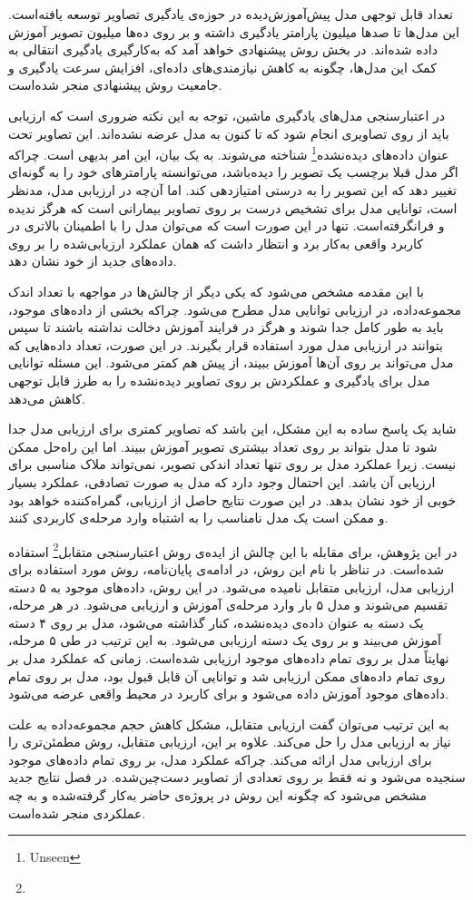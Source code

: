 تعداد قابل توجهی مدل پیش‌آموزش‌دیده در حوزه‌ی یادگیری تصاویر توسعه یافته‌است.
این مدل‌ها  تا صد‌ها میلیون پارامتر یادگیری داشته و بر روی ده‌ها میلیون تصویر آموزش داده شده‌اند. 
در بخش روش پیشنهادی خواهد آمد که به‌کارگیری یادگیری انتقالی به کمک این مدل‌ها، چگونه به کاهش نیازمندی‌های داده‌ای، افزایش سرعت یادگیری و جامعیت روش پیشنهادی منجر شده‌است.


در اعتبار‌سنجی مدل‌های یادگیری ماشین، توجه به این نکته ضروری است که ارزیابی باید از روی تصاویری انجام شود که تا کنون به مدل عرضه نشده‌اند.
این تصاویر تحت عنوان داده‌های
 دیده‌نشده\footnote{Unseen}
 شناخته می‌شوند.
به یک بیان، این امر بدیهی است.
چراکه اگر مدل قبلا برچسب یک تصویر را دیده‌باشد، می‌توانسته پارامتر‌های خود را به گونه‌ای تغییر دهد که این تصویر را به درستی امتیازدهی کند.
اما آن‌چه در ارزیابی مدل، مدنظر است، توانایی مدل برای تشخیص درست بر روی تصاویر بیمارانی است که هرگز ندیده و فرانگرفته‌است.
تنها در این صورت است که می‌توان مدل را با اطمینان بالاتری در کاربرد واقعی به‌کار برد و انتظار داشت که همان عملکرد ارزیابی‌شده را بر روی داده‌های جدید از خود نشان دهد.

با این مقدمه مشخص می‌شود که
یکی دیگر از چالش‌ها در مواجهه با تعداد اندک مجموعه‌داده، در ارزیابی توانایی مدل مطرح می‌شود.
چراکه بخشی از داده‌های موجود، باید به طور کامل جدا شوند و هرگز در فرایند آموزش دخالت نداشته باشند تا سپس بتوانند در ارزیابی مدل مورد استفاده قرار بگیرند.
در این صورت، تعداد داده‌هایی که مدل می‌تواند بر روی آن‌ها آموزش ببیند، از پیش هم کمتر می‌شود.
این مسئله توانایی مدل برای یادگیری و عملکردش بر روی تصاویر دیده‌نشده را به طرز قابل توجهی کاهش می‌دهد.

شاید یک پاسخ ساده به این مشکل، این باشد که تصاویر کمتری برای ارزیابی مدل جدا شود تا مدل بتواند بر روی تعداد بیشتری تصویر آموزش ببیند.
اما این راه‌حل ممکن نیست.
زیرا عملکرد مدل بر روی تنها تعداد اندکی تصویر، نمی‌تواند ملاک مناسبی برای ارزیابی آن باشد.
این احتمال وجود دارد که مدل به صورت تصادفی، عملکرد بسیار خوبی از خود نشان بدهد.
در این صورت نتایج حاصل از ارزیابی،‌ گمراه‌کننده خواهد بود و ممکن است یک مدل نامناسب را به اشتباه وارد مرحله‌ی کاربردی کنند.

در این پژوهش، برای مقابله با این چالش از ایده‌ی روش
اعتبارسنجی متقابل\footnote{}
استفاده شده‌است.
در تناظر با نام این روش، در ادامه‌ی پایان‌نامه، روش مورد استفاده برای ارزیابی مدل، ارزیابی متقابل نامیده می‌شود.
در این روش،
داده‌های موجود به ۵ دسته تقسیم می‌شوند و مدل ۵ بار وارد مرحله‌ی آموزش و ارزیابی می‌شود.
در هر مرحله، یک دسته به عنوان داده‌ی دیده‌نشده، کنار گذاشته می‌شود، مدل بر روی ۴ دسته آموزش می‌بیند و بر روی یک دسته ارزیابی می‌شود. 
به این ترتیب در طی ۵ مرحله، نهایتاً مدل بر روی تمام داده‌های موجود ارزیابی شده‌است.
زمانی که عملکرد مدل بر روی تمام داده‌های ممکن ارزیابی شد و توانایی آن قابل قبول بود، مدل بر روی تمام داده‌های موجود آموزش داده‌ می‌شود و برای کاربرد در محیط واقعی عرضه می‌شود.

به این ترتیب می‌توان گفت ارزیابی متقابل، مشکل کاهش حجم مجموعه‌داده به علت نیاز به ارزیابی مدل را حل می‌کند.
علاوه بر این، ارزیابی متقابل، روش مطمئن‌تری را برای ارزیابی مدل ارائه می‌کند.
چراکه عملکرد مدل، بر روی تمام داده‌های موجود سنجیده می‌شود و نه فقط بر روی تعدادی از تصاویر دست‌چین‌شده.
در فصل نتایج جدید مشخص می‌شود که چگونه این روش در پروژه‌ی حاضر به‌کار گرفته‌شده و به چه عملکردی منجر شده‌است.